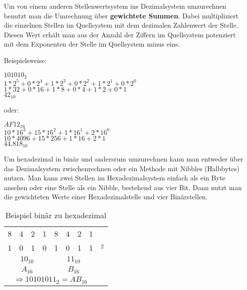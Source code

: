 Um von einem anderen Stellenwertsystem ins Dezimalsystem umzurechnen benutzt man die Umrechnung über \textbf{gewichtete Summen}. Dabei multipliziert die einzelnen Stellen im Quellsystem mit dem dezimalen Zahlenwert der Stelle. Diesen Wert erhält man aus der Anzahl der Ziffern im Quellsystem potenziert mit dem Exponenten der Stelle im Quellsystem minus eins.

Beispielsweise:

\begin{center}
    $101010_{2}$ \\
    $1 * 2^5 + 0 * 2^4 + 1 * 2^3 + 0 * 2^2 + 1 * 2^1 + 0 * 2^0$\\
    $1 * 32 + 0 * 16 + 1 * 8 + 0 * 4 + 1 * 2 + 0 * 1$\\
    $42_{10}$\\
\end{center}

oder:

\begin{center}
    $AF12_{16}$ \\
    $10 * 16^3 + 15 * 16^2 + 1 * 16^1 + 2 * 16^0$ \\
    $10 * 4096 + 15 * 256 + 1 * 16 + 2 * 1$ \\
    $44.818_{10}$
\end{center}

Um hexadezimal in binär und andersrum umzurechnen kann man entweder über das Dezimalsystem zwischenrechnen oder ein Methode mit Nibbles (Halbbytes) nutzen. Man kann zwei Stellen im Hexadezimalsystem einfach als ein Byte ansehen oder eine Stelle als ein Nibble, bestehend aus vier Bit. Dann nutzt man die gewichteten Werte einer Hexadezimalstelle und vier Binärstellen.

\begin{table}
    [H]\centering
    \begin{tabular}{cccc|ccccl}
        8                                                      & 4                             & 2 & 1 & 8 & 4 & 2 & 1 &      \\
        1                                                      & 0                             & 1 & 0 & 1 & 0 & 1 & 1 & $_2$ \\
        \multicolumn{4}{c|}{$10_{10}$}                         & \multicolumn{4}{c}{$11_{10}$} &                              \\
        \multicolumn{4}{c|}{$A_{16}$}                          & \multicolumn{4}{c}{$B_{16}$}  &                              \\\hline
        \multicolumn{8}{c}{$\Rightarrow 10101011_2 = AB_{16}$} &
    \end{tabular}
    \caption{Beispiel binär zu hexadezimal}
\end{table}

